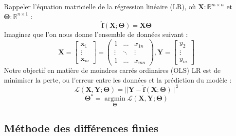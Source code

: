 \noindent Rappeler l'équation matricielle de la régression linéaire (LR), où $\mathbf{X} : \mathbb{R}^{m \times n}$ et $\bm\Theta : \mathbb{R}^{n \times 1}$ :
%
\begin{equation}\label{eq:lin_reg}
\mathbf{\hat f}(\mathbf{X}; \bm\Theta) = \mathbf{X}\bm\Theta
\end{equation}
%
Imaginez que l'on nous donne l'ensemble de données suivant :
%
\begin{equation}
\mathbf{X} =
\begin{bmatrix}
\mathbf{x}_1 \\
\vdots \\
\mathbf{x}_m
\end{bmatrix} =
\begin{pmatrix}
1 & \ldots & x_{1n} \\
\vdots & \ddots & \vdots \\
1 & \ldots & x_{mn}
\end{pmatrix},
\mathbf{Y} =
\begin{bmatrix}
y_2 \\
\vdots \\
y_m
\end{bmatrix}
\end{equation}
%
Notre objectif en matière de moindres carrés ordinaires (OLS) LR est de minimiser la perte, ou l'erreur entre les données et la prédiction du modèle :
%
\begin{equation}
\mathcal{L}(\mathbf{X}, \mathbf{Y}; \bm\Theta) = ||\mathbf{Y} - \mathbf{\hat f}(\mathbf{X}; \bm\Theta)||^2
\end{equation}
%
\begin{equation}
\bm\Theta^* = \underset{\bm\Theta}{\operatorname{argmin}}\mathcal{L}(\mathbf{X}, \mathbf{Y}; \bm\Theta)
\end{equation}

\subsection{Méthode des différences finies}\label{sec:fdm}

